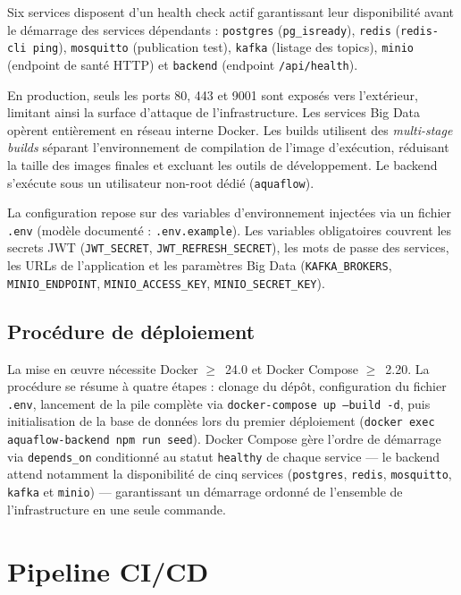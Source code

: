 Six services disposent d'un health check actif garantissant leur disponibilité avant
le démarrage des services dépendants : \texttt{postgres} (\texttt{pg\_isready}),
\texttt{redis} (\texttt{redis-cli ping}), \texttt{mosquitto} (publication test),
\texttt{kafka} (listage des topics), \texttt{minio} (endpoint de santé HTTP)
et \texttt{backend} (endpoint \texttt{/api/health}).

En production, seuls les ports 80, 443 et 9001 sont exposés vers l'extérieur,
limitant ainsi la surface d'attaque de l'infrastructure. Les services Big Data
opèrent entièrement en réseau interne Docker. Les builds utilisent des
\textit{multi-stage builds} séparant l'environnement de compilation de l'image
d'exécution, réduisant la taille des images finales et excluant les outils de
développement. Le backend s'exécute sous un utilisateur non-root dédié
(\texttt{aquaflow}).

La configuration repose sur des variables d'environnement injectées via un fichier
\texttt{.env} (modèle documenté : \texttt{.env.example}). Les variables obligatoires
couvrent les secrets JWT (\texttt{JWT\_SECRET}, \texttt{JWT\_REFRESH\_SECRET}),
les mots de passe des services, les URLs de l'application et les paramètres Big Data
(\texttt{KAFKA\_BROKERS}, \texttt{MINIO\_ENDPOINT},
\texttt{MINIO\_ACCESS\_KEY}, \texttt{MINIO\_SECRET\_KEY}).

\subsection{Procédure de déploiement}

La mise en œuvre nécessite Docker $\geq$~24.0 et Docker Compose $\geq$~2.20.
La procédure se résume à quatre étapes : clonage du dépôt, configuration du
fichier \texttt{.env}, lancement de la pile complète via
\texttt{docker-compose up --build -d}, puis initialisation de la base de données
lors du premier déploiement
(\texttt{docker exec aquaflow-backend npm run seed}).
Docker Compose gère l'ordre de démarrage via \texttt{depends\_on} conditionné au
statut \texttt{healthy} de chaque service — le backend attend notamment la disponibilité
de cinq services (\texttt{postgres}, \texttt{redis}, \texttt{mosquitto}, \texttt{kafka}
et \texttt{minio}) — garantissant un démarrage ordonné de l'ensemble de l'infrastructure
en une seule commande.

\section{Pipeline CI/CD}

